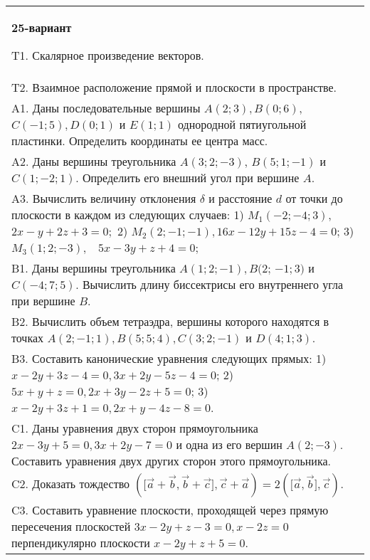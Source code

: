 \documentclass{article}
\begin{document}
\begin{tabular}{m{17cm}}
\textbf{25-вариант}
\newline

T1. 
Скалярное произведение векторов.
 \\
T2. 
Взаимное расположение прямой и плоскости в пространстве.
 \\
A1. 
Даны последовательные вершины \(A(2;3),B(0;6)\), \(C( - 1;5),D(0;1)\) и \(E(1;1)\) однородной пятиугольной пластинки. Определить координаты ее центра масс.
 \\
A2. 
Даны вершины треугольника \(A(3;2; - 3)\), \(B(5;1; - 1)\) и \(C(1; - 2;1)\). Определить его внешний угол при вершине \(A\).
 \\
A3. 
Вычислить величину отклонения \(\delta\) и расстояние \(d\) от точки до плоскости в каждом из следующих случаев: 1) \(M_{1}( - 2; - 4;3)\), \(2x - y + 2z + 3 = 0;\) 2) \(M_{2}(2; - 1; - 1),16x - 12y + 15z - 4 = 0\); 3) \(M_{3}(1;2; - 3),\ \ \ \ 5x - 3y + z + 4 = 0\);
 \\
B1. 
Даны вершины треугольника \(A(1;2; - 1),B(2\); \(- 1;3)\) и \(C( - 4;7;5)\). Вычислить длину биссектрисы его внутреннего угла при вершине \(B\).
 \\
B2. 
Вычислить объем тетраэдра, вершины которого находятся в точках \(A(2; - 1;1),B(5;5;4),C(3;2; - 1)\) и \(D(4;1;3)\).
 \\
B3. 
Составить канонические уравнения следующих прямых: 1) \(x - 2y + 3z - 4 = 0,3x + 2y - 5z - 4 = 0\); 2) \(5x + y + z = 0,2x + 3y - 2z + 5 = 0\); 3) \(x - 2y + 3z + 1 = 0,2x + y - 4z - 8 = 0\).
 \\
C1. 
Даны уравнения двух сторон прямоугольника \(2x - 3y + 5 = 0,3x + 2y - 7 = 0\) и одна из его вершин \(A(2; - 3)\). Составить уравнения двух других сторон этого прямоугольника.
 \\
C2. 
Доказать тождество \((\lbrack\overrightarrow{a} + \overrightarrow{b},\overrightarrow{b} + \overrightarrow{c}\rbrack,\overrightarrow{c} + \overrightarrow{a}) = 2(\lbrack\overrightarrow{a},\overrightarrow{b}\rbrack,\overrightarrow{c})\).
 \\
C3. 
Составить уравнение плоскости, проходящей через прямую пересечения плоскостей \(3x - 2y + z - 3 = 0,x - 2z = 0\) перпендикулярно плоскости \(x - 2y + z + 5 = 0\).
 \\

\end{tabular}
\vspace{1cm}
\end{document}
